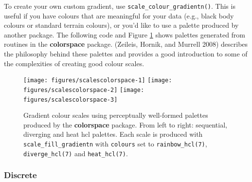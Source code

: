 To create your own custom gradient, use
\texttt{scale\_colour\_gradientn()}. This is useful if you have colours
that are meaningful for your data (e.g., black body colours or standard
terrain colours), or you'd like to use a palette produced by another
package. The following code and Figure \ref{fig:colorspace} shows
palettes generated from routines in the \textbf{colorspace} package.
(Zeileis, Hornik, and Murrell 2008) describes the philosophy behind
these palettes and provides a good introduction to some of the
complexities of creating good colour scales. 
 

\begin{Shaded}
\begin{Highlighting}[]
\NormalTok{(}\NormalTok{)}
\StringTok{ }
  \NormalTok{(} \NormalTok{(}\NormalTok{), } \NormalTok{(}\NormalTok{, }\NormalTok{))}
\NormalTok{\}}
\StringTok{ }
\StringTok{ }
\StringTok{ }
\end{Highlighting}
\end{Shaded}

\begin{figure}

{\centering \texttt{[image: figures/scalescolorspace-1]} \texttt{[image: figures/scalescolorspace-2]} \texttt{[image: figures/scalescolorspace-3]} 

}

\caption{Gradient colour scales using perceptually well-formed palettes produced by the \textbf{colorspace} package.  From left to right: sequential, diverging and heat hcl palettes.  Each scale is produced with \texttt{scale\_fill\_gradientn} with \texttt{colours} set to \texttt{rainbow\_hcl(7)}, \texttt{diverge\_hcl(7)} and \texttt{heat\_hcl(7)}.\label{fig:colorspace}}
\end{figure}

\subsubsection{Discrete}\label{ssub:colour-discrete}

